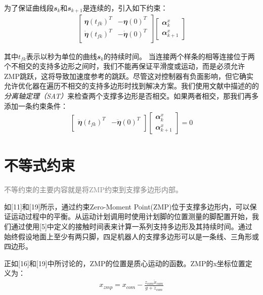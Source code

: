 为了保证曲线段$\mathbfit{s}_k$和$\mathbfit{s}_{k+1}$是连续的，引入如下约束：
\begin{align}
    \begin{bmatrix}
        \mathbfit{\eta}(t_{fk})^T & -\mathbfit{\eta}(0)^T\\
        \mathbfit{\dot \eta}(t_{fk})^T & -\mathbfit{\dot \eta}(0)^T\\
    \end{bmatrix} 
    \begin{bmatrix}
        \mathbfit{\alpha}_k^x\\
        \mathbfit{\alpha}_{k+1}^x
    \end{bmatrix}
\end{align}

其中$t_{fk}$表示以秒为单位的曲线$\mathbfit{s}_k$的持续时间。
当连接两个样条的相等连接位于两个不相交的支持多边形之间时，我们不能再保证平滑度或运动，而是必须允许ZMP跳跃，这将导致加速度参考的跳跃。尽管这对控制器有负面影响，但它确实允许优化器在遍历不相交的支持多边形时找到解决方案。我们使用文献\cite{}中描述的的\emph{分离轴定理（SAT）}来检查两个支撑多边形是否相交。如果两者相交，那我们再多添加一条约束条件：
\begin{align}
    \begin{bmatrix}
        \mathbfit{\ddot \eta}(t_{fk})^T & -\mathbfit{\ddot \eta}(0)^T\\
    \end{bmatrix} 
    \begin{bmatrix}
        \mathbfit{\alpha}_k^x\\
        \mathbfit{\alpha}_{k+1}^x
    \end{bmatrix}=0
\end{align}




\section{不等式约束}

\textcolor{gray}{\small
    不等约束的主要内容就是将ZMP约束到支撑多边形内部。}

如[11]和[19]所示，通过约束Zero-Moment Point(ZMP)位于支撑多边形内，可以保证运动过程中的平衡。从运动计划调用时使用计划脚的位置测量的脚配置开始，我们通过使用[5]中定义的接触时间表来计算一系列支持多边形及其持续时间。通过始终假设地面上至少有两只脚，四足机器人的支撑多边形可以是一条线、三角形或四边形。

正如[16]和[19]中所讨论的，ZMP的位置是质心运动的函数。ZMP的x坐标位置定义为：
\begin{align}
    \label{function:zmp}
    x_{zmp}=x_{com}-\frac{z_{com}\ddot x_{com}}{g+\ddot z_{com}}
\end{align}

